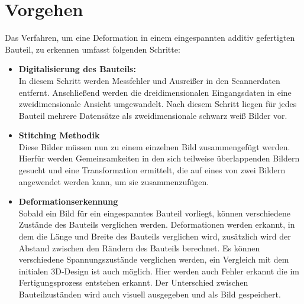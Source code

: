 \section{Vorgehen}

Das Verfahren, um eine Deformation in einem eingespannten additiv gefertigten
Bauteil, zu erkennen umfasst folgenden Schritte:

\begin{itemize}
    \item \textbf{Digitalisierung des Bauteils:}\\
        In diesem Schritt werden Messfehler und Ausreißer
        in den Scannerdaten entfernt. Anschließend werden die dreidimensionalen 
        Eingangsdaten in eine zweidimensionale Ansicht umgewandelt.
        Nach diesem Schritt liegen für jedes Bauteil mehrere Datensätze als 
        zweidimensionale schwarz weiß Bilder vor.
    \item \textbf{Stitching Methodik}\\
        Diese Bilder müssen nun zu einem einzelnen Bild zusammengefügt werden.
        Hierfür werden Gemeinsamkeiten in den sich 
        teilweise überlappenden Bildern gesucht und eine Transformation ermittelt,
        die auf eines von zwei Bildern angewendet werden kann, um sie zusammenzufügen.
    \item \textbf{Deformationserkennung}\\
        Sobald ein Bild für ein eingespanntes Bauteil vorliegt, können verschiedene 
        Zustände des Bauteils verglichen werden. Deformationen werden erkannt, in dem 
        die Länge und Breite des Bauteils verglichen wird, zusätzlich wird der 
        Abstand zwischen den Rändern des Bauteils berechnet. Es können verschiedene
        Spannungszustände verglichen werden, ein Vergleich mit dem initialen 
        3D-Design ist auch möglich. Hier werden auch Fehler erkannt die im 
        Fertigungsprozess entstehen erkannt. Der Unterschied zwischen Bauteilzuständen
        wird auch visuell ausgegeben und als Bild gespeichert.
        
\end{itemize}

























